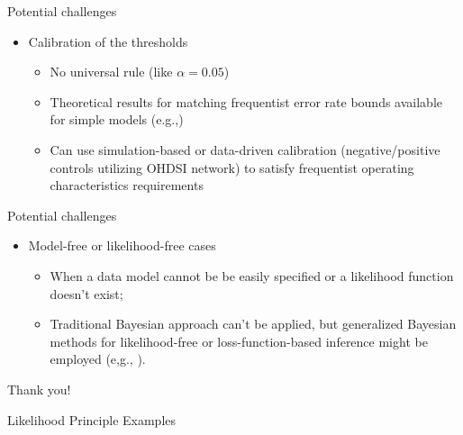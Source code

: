 \documentclass[xcolor=dvipsnames]{beamer}
\begin{document}
\begin{frame}{Potential challenges}
\begin{itemize}
    \item Calibration of the thresholds
    \begin{itemize}
        \item No universal rule (like $\alpha = 0.05$)
        \item Theoretical results for matching frequentist error rate bounds available for simple models (e.g.,\cite{berger1994unified, cornfield1966bayesian})
        \pause
        \item Can use simulation-based or data-driven calibration (negative/positive controls utilizing OHDSI network) to satisfy frequentist operating characteristics requirements 
    \end{itemize}
\end{itemize}
    
\end{frame}

\begin{frame}{Potential challenges}
\begin{itemize}
    \item Model-free or likelihood-free cases
    \begin{itemize}
        \item When a data model cannot be be easily specified or a likelihood function doesn't exist;
        \item Traditional Bayesian approach can't be applied, but generalized Bayesian methods for likelihood-free or loss-function-based inference might be employed (e,g., \cite{turner2014generalized, lyddon2019general, bissiri2016general}).
    \end{itemize}
\end{itemize}
    
\end{frame}


\begin{frame}
    \Huge{\centerline{Thank you!}}
\end{frame}


\begin{frame}
\Huge{\centerline{Likelihood Principle Examples}}
\end{frame}
\end{document}
